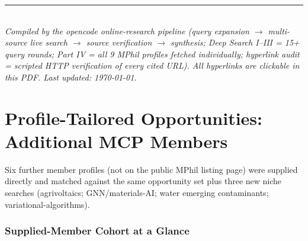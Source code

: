 \documentclass[11pt,a4paper]{article}
\begin{document}
\bigskip
\noindent\rule{\textwidth}{0.4pt}\\
\small\emph{Compiled by the opencode online-research pipeline (query expansion $\rightarrow$ multi-source live search $\rightarrow$ source verification $\rightarrow$ synthesis; Deep Search I--III = 15+ query rounds; Part IV = all 9 MPhil profiles fetched individually; hyperlink audit = scripted HTTP verification of every cited URL). All hyperlinks are clickable in this PDF. Last updated: \today.}



\newpage
\part{Profile-Tailored Opportunities: Additional MCP Members}

Six further member profiles (not on the public MPhil listing page) were supplied directly and matched against the same opportunity set plus three new niche searches (agrivoltaics; GNN/materials-AI; water emerging contaminants; variational-algorithms).

\section{Supplied-Member Cohort at a Glance}
\end{document}
